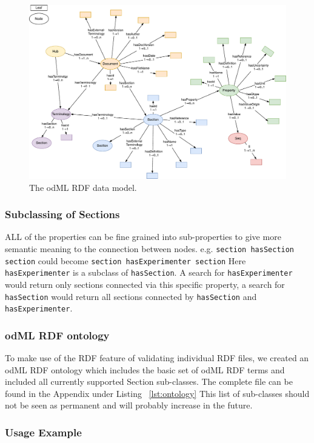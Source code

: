 \documentclass{article}
\begin{document}
\begin{figure}
\begin{center}
\includegraphics[width=0.90\columnwidth]{figures/odmlRDFDataModel.pdf}
\caption{The odML RDF data model.}
\label{fig:rdfModel}
\end{center}
\end{figure}

\subsubsection{Subclassing of Sections} \label{sec:rdf_subclassing}
ALL of the properties can be fine grained into sub-properties to give more semantic meaning to the connection between nodes.
e.g.
    \texttt{section hasSection section}
 could become
    \texttt{section hasExperimenter section}
Here \texttt{hasExperimenter} is a subclass of \texttt{hasSection}. A search for \texttt{hasExperimenter} would return only sections connected via this specific property, a search for \texttt{hasSection} would return all sections connected by \texttt{hasSection} and \texttt{hasExperimenter}.

\subsubsection{odML RDF ontology} \label{sec:odml_ontology}
To make use of the RDF feature of validating individual RDF files, we created an odML RDF ontology which includes the basic set of odML RDF terms and included all currently supported Section sub-classes. The complete file can be found in the Appendix under Listing ~\ref{lst:ontology} This list of sub-classes should not be seen as permanent and will probably increase in the future.

\subsubsection{Usage Example} \label{sec:local_usage}
\end{document}

